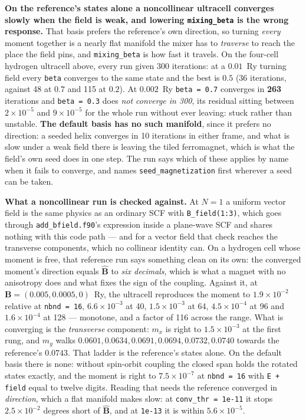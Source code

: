 \documentclass[11pt,a4paper]{article}
\newcommand{\code}[1]{\texttt{\small #1}}
\begin{document}
\textbf{On the reference's states alone a noncollinear ultracell converges
slowly when the field is weak, and lowering \code{mixing\_beta} is the wrong
response.} That basis prefers the reference's own direction, so turning
\emph{every} moment together is a nearly flat manifold the mixer has to
\emph{traverse} to reach the place the field pins, and \code{mixing\_beta} is
how fast it travels. On the four-cell hydrogen ultracell above, every run given
300 iterations: at a $0.01$~Ry turning field every \code{beta} converges to the
same state and the best is $0.5$ (36 iterations, against 48 at $0.7$ and 115 at
$0.2$). At $0.002$~Ry \code{beta = 0.7} converges in \textbf{263} iterations
and \code{beta = 0.3} does \emph{not converge in 300}, its residual sitting
between $2\times10^{-5}$ and $9\times10^{-5}$ for the whole run without ever
leaving: stuck rather than unstable. \textbf{The default basis has no such
manifold}, since it prefers no direction: a seeded helix converges in 10
iterations in either frame, and what is slow under a weak field there is
leaving the tiled ferromagnet, which is what the field's own seed does in one
step. The run says which of these applies by name when it fails to converge,
and names \code{seed\_magnetization} first wherever a seed can be taken.

\textbf{What a noncollinear run is checked against.} At $N=1$ a uniform vector
field is the same physics as an ordinary SCF with \code{B\_field(1:3)}, which
goes through \code{add\_bfield.f90}'s expression inside a plane-wave SCF and
shares nothing with this code path --- and for a vector field that check reaches
the transverse components, which no collinear identity can. On a hydrogen cell
whose moment is free, that reference run says something clean on its own: the
converged moment's direction equals $\hat{\mathbf B}$ to \emph{six decimals},
which is what a magnet with no anisotropy does and what fixes the sign of the
coupling. Against it, at $\mathbf B = (0.005, 0.0005, 0)$~Ry, the ultracell
reproduces the moment to $1.9\times10^{-2}$ relative at \code{nbnd = 16},
$6.6\times10^{-3}$ at 40, $1.5\times10^{-3}$ at 64, $4.5\times10^{-4}$ at 96 and
$1.6\times10^{-4}$ at 128 --- monotone, and a factor of 116 across the range. What is converging is the
\emph{transverse} component: $m_x$ is right to $1.5\times10^{-3}$ at the first
rung, and $m_y$ walks $0.0601, 0.0634, 0.0691, 0.0694, 0.0732, 0.0740$ towards
the reference's $0.0743$. That ladder is the reference's states alone. On the
default basis there is none: without spin-orbit coupling the closed span holds
the rotated states exactly, and the moment is right to $7.5\times10^{-7}$ at
\code{nbnd = 16} with \code{E + field} equal to twelve digits. Reading that
needs the reference converged in \emph{direction}, which a flat manifold makes
slow: at \code{conv\_thr = 1e-11} it stops $2.5\times10^{-2}$ degrees short of
$\hat{\mathbf B}$, and at \code{1e-13} it is within $5.6\times10^{-5}$.
\end{document}
